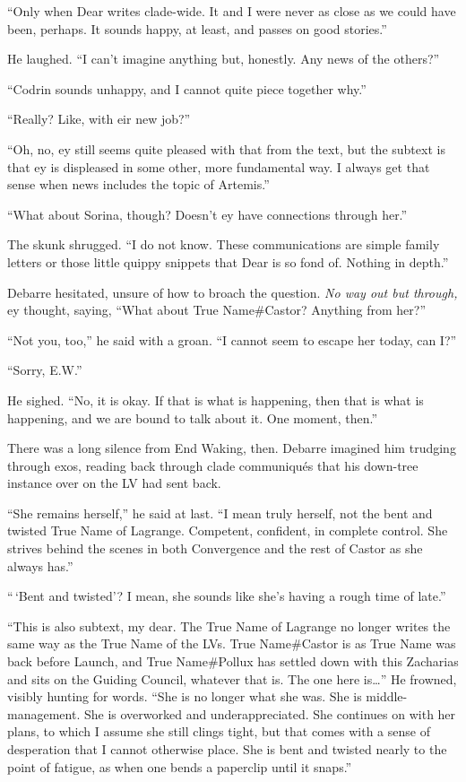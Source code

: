 ``Only when Dear writes clade-wide. It and I were never as close as we could have been, perhaps. It sounds happy, at least, and passes on good stories.''

He laughed. ``I can't imagine anything but, honestly. Any news of the others?''

``Codrin sounds unhappy, and I cannot quite piece together why.''

``Really? Like, with eir new job?''

``Oh, no, ey still seems quite pleased with that from the text, but the subtext is that ey is displeased in some other, more fundamental way. I always get that sense when news includes the topic of Artemis.''

``What about Sorina, though? Doesn't ey have connections through her.''

The skunk shrugged. ``I do not know. These communications are simple family letters or those little quippy snippets that Dear is so fond of. Nothing in depth.''

Debarre hesitated, unsure of how to broach the question. \emph{No way out but through,} ey thought, saying, ``What about True Name\#Castor? Anything from her?''

``Not you, too,'' he said with a groan. ``I cannot seem to escape her today, can I?''

``Sorry, E.W.''

He sighed. ``No, it is okay. If that is what is happening, then that is what is happening, and we are bound to talk about it. One moment, then.''

There was a long silence from End Waking, then. Debarre imagined him trudging through exos, reading back through clade communiqués that his down-tree instance over on the LV had sent back.

``She remains herself,'' he said at last. ``I mean truly herself, not the bent and twisted True Name of Lagrange. Competent, confident, in complete control. She strives behind the scenes in both Convergence and the rest of Castor as she always has.''

``\,`Bent and twisted'? I mean, she sounds like she's having a rough time of late.''

``This is also subtext, my dear. The True Name of Lagrange no longer writes the same way as the True Name of the LVs. True Name\#Castor is as True Name was back before Launch, and True Name\#Pollux has settled down with this Zacharias and sits on the Guiding Council, whatever that is. The one here is\ldots{}'' He frowned, visibly hunting for words. ``She is no longer what she was. She is middle-management. She is overworked and underappreciated. She continues on with her plans, to which I assume she still clings tight, but that comes with a sense of desperation that I cannot otherwise place. She is bent and twisted nearly to the point of fatigue, as when one bends a paperclip until it snaps.''

